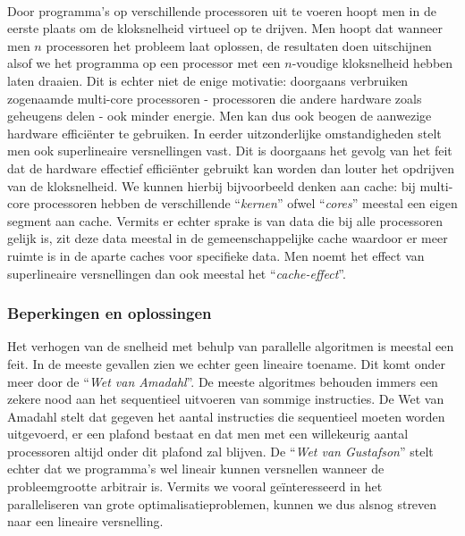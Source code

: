 \paragraph{}
Door programma's op verschillende processoren uit te voeren hoopt men in de eerste plaats om de kloksnelheid virtueel op te drijven. Men hoopt dat wanneer men $n$ processoren het probleem laat oplossen, de resultaten doen uitschijnen alsof we het programma op een processor met een $n$-voudige kloksnelheid hebben laten draaien. Dit is echter niet de enige motivatie: doorgaans verbruiken zogenaamde multi-core processoren - processoren die andere hardware zoals geheugens delen - ook minder energie. Men kan dus ook beogen de aanwezige hardware effici\"enter te gebruiken. In eerder uitzonderlijke omstandigheden stelt men ook superlineaire versnellingen vast. Dit is doorgaans het gevolg van het feit dat de hardware effectief effici\"enter gebruikt kan worden dan louter het opdrijven van de kloksnelheid. We kunnen hierbij bijvoorbeeld denken aan cache: bij multi-core processoren hebben de verschillende ``\emph{kernen}'' ofwel ``\emph{cores}'' meestal een eigen segment aan cache. Vermits er echter sprake is van data 
die bij alle processoren gelijk is, zit deze data meestal in de gemeenschappelijke cache waardoor er meer ruimte is in de aparte caches voor specifieke data. Men noemt het effect van superlineaire versnellingen dan ook meestal het ``\emph{cache-effect}''\cite{cacheEffect}.

\subsubsection{Beperkingen en oplossingen}

Het verhogen van de snelheid met behulp van parallelle algoritmen is meestal een feit. In de meeste gevallen zien we echter geen lineaire toename. Dit komt onder meer door de ``\emph{Wet van Amadahl}''\cite{Amdahl:1967:VSP:1465482.1465560}. De meeste algoritmes behouden immers een zekere nood aan het sequentieel uitvoeren van sommige instructies. De Wet van Amadahl stelt dat gegeven het aantal instructies die sequentieel moeten worden uitgevoerd, er een plafond bestaat en dat men met een willekeurig aantal processoren altijd onder dit plafond zal blijven. De ``\emph{Wet van Gustafson}''\cite{Gustafson:1988:RAL:42411.42415} stelt echter dat we programma's wel lineair kunnen versnellen wanneer de probleemgrootte arbitrair is. Vermits we vooral ge\"interesseerd in het paralleliseren van grote optimalisatieproblemen, kunnen we dus alsnog streven naar een lineaire versnelling.

